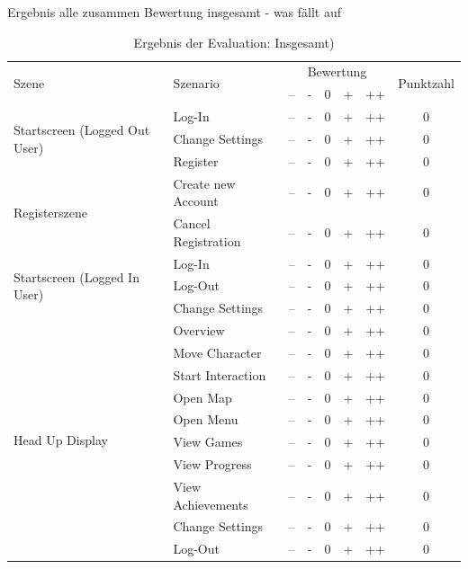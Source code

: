 			Ergebnis alle zusammen
			Bewertung insgesamt - was fällt auf
			\begin{table}[htbp]
				\begin{tabular}{|l|l|c|c|c|c|c|c|}
					\hline
					\multirow{2}{*}{Szene} & \multirow{2}{*}{Szenario} & \multicolumn{5}{c}{Bewertung} \vline & \multirow{2}{*}{Punktzahl} \\ 
					& & -- & - & 0 & + & ++ & \\ \hline
					\multirow{3}{*}{Startscreen (Logged Out User)} & Log-In & -- & - & 0 & + & ++ & 0 \\ 
					& Change Settings & -- & - & 0 & + & ++ & 0 \\ 
					& Register & -- & - & 0 & + & ++ & 0 \\ \hline 
					\multirow{2}{*}{Registerszene} & Create new Account & -- & - & 0 & + & ++ & 0 \\ 
					& Cancel Registration & -- & - & 0 & + & ++ & 0 \\ \hline 
					\multirow{3}{*}{Startscreen (Logged In User)} & Log-In & -- & - & 0 & + & ++ & 0 \\ 
					& Log-Out & -- & - & 0 & + & ++ & 0 \\ 
					& Change Settings & -- & - & 0 & + & ++ & 0 \\ \hline 
					\multirow{10}{*}{Head Up Display} & Overview & -- & - & 0 & + & ++ & 0 \\  
					& Move Character & -- & - & 0 & + & ++ & 0 \\  
					& Start Interaction & -- & - & 0 & + & ++ & 0 \\  
					& Open Map & -- & - & 0 & + & ++ & 0 \\  
					& Open Menu & -- & - & 0 & + & ++ & 0 \\  
					& View Games & -- & - & 0 & + & ++ & 0 \\  
					& View Progress & -- & - & 0 & + & ++ & 0 \\
					& View Achievements & -- & - & 0 & + & ++ & 0 \\ 
					& Change Settings & -- & - & 0 & + & ++ & 0 \\ 
					& Log-Out & -- & - & 0 & + & ++ & 0 \\ 
					\hline
				\end{tabular}
				\caption{Ergebnis der Evaluation: Insgesamt)}
				\label{tab:ergbnisOverall}
			\end{table}
			